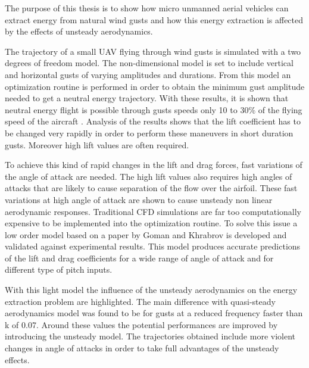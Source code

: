 \par The purpose of this thesis is to show how micro unmanned aerial vehicles can extract energy from natural wind gusts and how this energy extraction is affected by the effects of unsteady aerodynamics.

\par The trajectory of a small UAV flying through wind gusts is simulated with a two degrees of freedom model.
The non-dimensional model is set to include vertical and horizontal gusts of varying amplitudes and durations.
From this model an optimization routine is performed in order to obtain the minimum gust amplitude needed to get a neutral energy trajectory.
With these results, it is shown that neutral energy flight is possible through gusts speeds only 10 to 30\% of the flying speed of the aircraft .
Analysis of the results shows that the lift coefficient has to be changed very rapidly in order to perform these maneuvers in short duration gusts. 
Moreover high lift values are often required. 

\par To achieve this kind of rapid changes in the lift and drag forces, fast variations of the angle of attack are needed.
The high lift values also requires high angles of attacks that are likely to cause separation of the flow over the airfoil.
These fast variations at high angle of attack are shown to cause unsteady non linear aerodynamic responses.
Traditional CFD simulations are far too computationally expensive to be implemented into the optimization routine.
To solve this issue a low order model based on a paper by Goman and Khrabrov \cite{GK} is developed and validated against experimental results.
This model produces accurate predictions of the lift and drag coefficients for a wide range of angle of attack and for different type of pitch inputs.

\par With this light model the influence of the unsteady aerodynamics on the energy extraction problem are highlighted.
The main difference with quasi-steady aerodynamics model was found to be for gusts at a reduced frequency faster than k of 0.07.
Around these values the potential performances are improved by introducing the unsteady model.
The trajectories obtained include more violent changes in angle of attacks in order to take full advantages of the unsteady effects.




